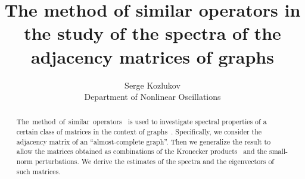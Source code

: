 \documentclass[a4paper]{jpconf}
\begin{document}
\title{The method of similar operators in the study of the spectra of the adjacency matrices of graphs}

\author{Serge Kozlukov\\
Department of Nonlinear Oscillations}

\address{Voronezh State University, 1 Universitetskaya Ploshad', Voronezh, RU 394036}


\begin{abstract}
    The~method~of~similar~operators~\cite{baskakov1983methods,baskakov2017method,baskakov2013completeness}
        is used to investigate spectral properties
        of a certain class of matrices in the context of graphs~\cite{van2003graphs,cvetkovic1980spectra}.
    Specifically, we consider
        the adjacency matrix of an ``almost-complete graph''.
    Then we generalize the result to allow the matrices obtained as combinations
        of the Kronecker products~\cite{bellman-matrices-kron,XIANG2005210}
        and the small-norm perturbations.
    We derive the estimates
        of the spectra and the eigenvectors
        of such matrices.
\end{abstract}
\end{document}
